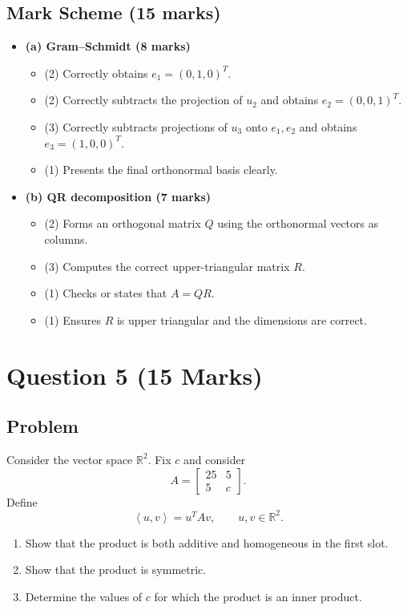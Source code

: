 \documentclass[12pt]{article}
\newcommand{\R}{\mathbb{R}}
\newcommand{\ip}[2]{\left\langle #1,#2\right\rangle}
\begin{document}
\subsection{Mark Scheme (15 marks)}
\begin{itemize}[leftmargin=1.6em]
  \item \textbf{(a) Gram--Schmidt (8 marks)}
  \begin{itemize}[leftmargin=1.6em]
    \item (2) Correctly obtains $e_1=(0,1,0)^T$.
    \item (2) Correctly subtracts the projection of $u_2$ and obtains $e_2=(0,0,1)^T$.
    \item (3) Correctly subtracts projections of $u_3$ onto $e_1,e_2$ and obtains $e_3=(1,0,0)^T$.
    \item (1) Presents the final orthonormal basis clearly.
  \end{itemize}
  \item \textbf{(b) QR decomposition (7 marks)}
  \begin{itemize}[leftmargin=1.6em]
    \item (2) Forms an orthogonal matrix $Q$ using the orthonormal vectors as columns.
    \item (3) Computes the correct upper-triangular matrix $R$.
    \item (1) Checks or states that $A=QR$.
    \item (1) Ensures $R$ is upper triangular and the dimensions are correct.
  \end{itemize}
\end{itemize}

\newpage
\section{Question 5 \hfill (15 Marks)}

\subsection{Problem}
Consider the vector space $\R^2$. Fix $c$ and consider
\[
A=\begin{bmatrix}25&5\\5&c\end{bmatrix}.
\]
Define
\[
\ip{u}{v}=u^TAv,
\qquad u,v\in\R^2.
\]
\begin{enumerate}[label=(\alph*)]
  \item Show that the product is both additive and homogeneous in the first slot.
  \item Show that the product is symmetric.
  \item Determine the values of $c$ for which the product is an inner product.
\end{enumerate}
\end{document}
